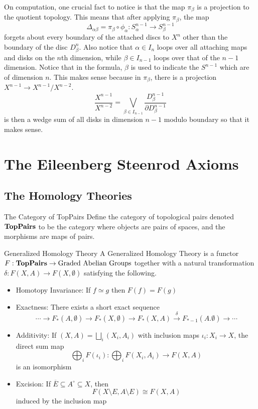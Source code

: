 \documentclass[a4paper]{article}
\begin{document}
On computation, one crucial fact to notice is that the map $\pi_\beta$ is a projection to the quotient topology. This means that after applying $\pi_\beta$, the map $$\Delta_{\alpha\beta}=\pi_\beta\circ\phi_\alpha:S_\alpha^{n-1}\to S_\beta^{n-1}$$ forgets about every boundary of the attached discs to $X^n$ other than the boundary of the disc $D_\beta^n$. Also notice that $\alpha\in I_n$ loops over all attaching maps and disks on the $n$th dimension, while $\beta\in I_{n-1}$ loops over that of the $n-1$ dimension. Notice that in the formula, $\beta$ is used to indicate the $S^{n-1}$ which are of dimension $n$. This makes sense because in $\pi_\beta$, there is a projection $X^{n-1}\to X^{n-1}/X^{n-2}$. $$\frac{X^{n-1}}{X^{n-2}}=\bigvee_{\beta\in I_{n-1}}\frac{D_\beta^{n-1}}{\partial D_\beta^{n-1}}$$ is then a wedge sum of all disks in dimension $n-1$ modulo boundary so that it makes sense. 

\pagebreak
\section{The Eileenberg Steenrod Axioms}
\subsection{The Homology Theories}
\begin{defn}{The Category of TopPairs}{} Define the category of topological pairs denoted $\bold{TopPairs}$ to be the category where objects are pairs of spaces, and the morphisms are maps of pairs. 
\end{defn}

\begin{defn}{Generalized Homology Theory}{} A Generalized Homology Theory is a functor $F:\bold{TopPairs}\to\text{Graded Abelian Groups}$ together with a natural transformation $\delta:F(X,A)\to F(X,\emptyset)$ satisfying the following. 
\begin{itemize}
\item Homotopy Invariance: If $f\simeq g$ then $F(f)=F(g)$
\item Exactness: There exists a short exact sequence $$\cdots\to F_\ast(A,\emptyset)\to F_\ast(X,\emptyset)\to F_\ast(X,A)\overset{\delta}{\to} F_{\ast-1}(A.\emptyset)\to\cdots$$
\item Additivity: If $(X,A)=\bigsqcup_i(X_i,A_i)$ with inclusion maps $\iota_i:X_i\to X$, the direct sum map $$\bigoplus_iF(\iota_i):\bigoplus_iF(X_i,A_i)\to F(X,A)$$ is an isomorphism
\item Excision: If $\overline{E}\subseteq A^\circ\subseteq X$, then $$F(X\setminus E,A\setminus E)\cong F(X,A)$$ induced by the inclusion map
\end{itemize}
\end{defn}
\end{document}
